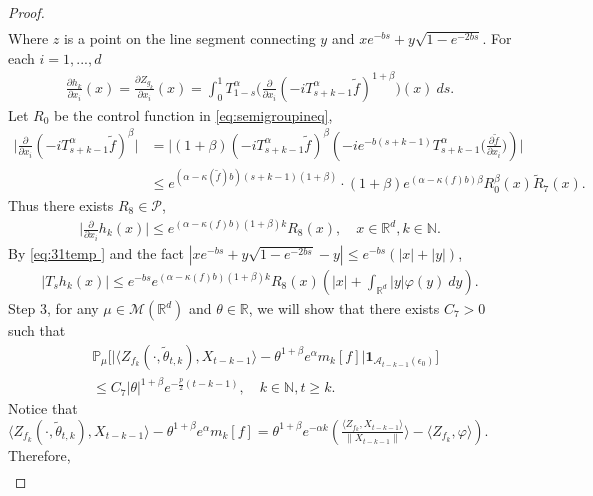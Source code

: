 \documentclass[12pt,oneside,english]{amsart}
\theoremstyle{plain}
\theoremstyle{definition}
\numberwithin{equation}{section}
\begin{document}
\begin{proof}
\begin{align}
  \end{align}
 Where $z$ is a point on the line segment connecting $y$ and $xe^{-bs}+y\sqrt{1-e^{-2bs}}$. For each $i=1,...,d$
 \begin{align}
     \frac{\partial h_k}{\partial x_i}(x)=\frac{\partial Z_{g_k}}{\partial x_i}(x)=\int_0^1 T^{\alpha}_{1-s}\Big(\frac{\partial}{\partial x_i}(-i T_{s+k-1}^{\alpha} \tilde{f})^{1+\beta}\Big)(x)~ds.
 \end{align}
  Let $R_0$ be the control function in \eqref{eq:semigroupineq},
      \begin{align}
        \Big|\frac{\partial}{\partial x_i}(-i T_{s+k-1}^{\alpha}\tilde{f})^{\beta}\Big|&=\Big|(1+\beta)(-i T_{s+k-1}^{\alpha}\tilde{f})^{\beta}(-i e^{-b(s+k-1)}T_{s+k-1}^{\alpha}\big(\frac{\partial \tilde{f}}{\partial x_i}\big))\Big|\\
        &\leq e^{(\alpha-\kappa(\tilde{f})b)(s+k-1)(1+\beta)}\cdot (1+\beta)e^{(\alpha-\kappa(f)b)\beta}R_0^{\beta}(x)\tilde{R}_7(x).
    \end{align}
Thus there exists $R_8\in \mathcal{P}$,
\begin{align}
\label{eq:31temp }
    \Big|\frac{\partial}{\partial x_i}h_k(x)\Big|\leq e^{(\alpha-\kappa(f)b)(1+\beta)k}R_8(x),\quad x\in \mathbb{R}^d, k\in \mathbb{N}.
\end{align}
By \eqref{eq:31temp } and the fact $|xe^{-bs}+y\sqrt{1-e^{-2bs}}-y|\leq e^{-bs}(|x|+|y|)$,
\begin{align}
    |T_s h_k(x)|\leq e^{-bs}e^{(\alpha-\kappa(f)b)(1+\beta)k}R_8(x)(|x|+\int_{\mathbb{R}^d}|y|\varphi(y)~dy).
\end{align}
Step 3, for any $\mu \in \mathcal{M}(\mathbb{R}^d)$ and $\theta\in \mathbb{R}$, we will show that there exists $C_7>0$ such that
\begin{align}
\label{eq:31step3}
    &\mathbb{P}_{\mu}\big[\big|\langle Z_{f_k}(\cdot,\tilde{\theta}_{t,k}),X_{t-k-1}\rangle-\theta^{1+\beta}e^{\alpha}m_k[f]\big|\mathbf{1}_{\mathcal{A}_{t-k-1}(\epsilon_0)}\big]\\
    &\leq C_7|\theta|^{1+\beta} e^{-\frac{p}{2}(t-k-1)},\quad k\in \mathbb{N}, t\geq k.
\end{align}
    Notice that $\langle Z_{f_k}(\cdot,\tilde{\theta}_{t,k}),X_{t-k-1}\rangle-\theta^{1+\beta}e^{\alpha}m_k[f]=\theta^{1+\beta}e^{-\alpha k}(\frac{\langle Z_{f_k},X_{t-k-1}\rangle}{\|X_{t-k-1}\|} \rangle-\langle Z_{f_k},\varphi\rangle)$. Therefore,
\begin{align}

\end{align}
\end{proof}
\end{document}
